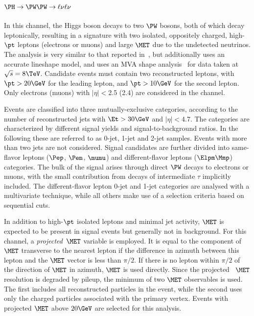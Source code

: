 \subsection{$\PH \to \PW\PW \to \ell\nu\ell\nu$}

In this channel, the Higgs boson decays to two $\PW$ bosons, both of which decay leptonically, resulting in a signature with two isolated, oppositely charged, high-$\pt$ leptons (electrons or muons) and large $\MET$ due to the undetected neutrinos.
The analysis is very similar to that reported in~\cite{CMSobservation125}, but additionally uses an accurate lineshape model, and uses an MVA shape analysis~\cite{Chatrchyan:2012ty} for data taken at $\sqrt{s}=8\TeV$.
Candidate events must contain two reconstructed leptons, with $\pt>20\GeV$ for the leading lepton, and $\pt>10\GeV$ for the
second lepton. Only electrons (muons) with $|\eta|<$2.5 (2.4) are considered in the channel.


Events are classified into three mutually-exclusive categories, according to the number of reconstructed jets
with $\Et>30\GeV$ and $|\eta|<$4.7. The categories are characterized by different signal yields and signal-to-background ratios. In the following these are referred to as 0-jet, 1-jet and 2-jet samples. Events with more than two jets are not considered. Signal candidates are further divided into same-flavor leptons ($\Pep$, $\Pem$, $\mumu$) and different-flavor leptons ($\Elpm\Mmp$) categories. The bulk of the signal arises through direct $\PW$ decays to electrons or muons, with the 
small contribution from decays of intermediate $\tau$ implicitly included. The different-flavor lepton 0-jet and 1-jet categories are analysed with a multivariate technique, while all others make use of a selection criteria based on
sequential cuts.

In addition to high-$\pt$ isolated leptons and minimal jet activity, $\MET$ is expected to be present in signal events but
generally not in background. For this channel, a \textit{projected}~$\MET$ variable is employed. It is equal to the
component of $\MET$ transverse to the nearest lepton if the difference in azimuth between this lepton and the $\MET$ vector is less than $\pi/2$. If there is no lepton within $\pi/2$ of the direction of $\MET$ in azimuth, $\MET$ is used directly.  Since the projected ~$\MET$ resolution is degraded by pileup, the minimum of two $\MET$ observables is used. The first includes all reconstructed particles in the event, while the second uses only the charged particles associated with the primary vertex. Events with projected $\MET$ above $20\GeV$ are selected for this analysis.

